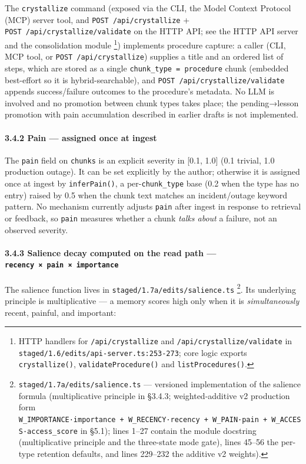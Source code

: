 \documentclass[
]{article}
\begin{document}
The \texttt{crystallize} command (exposed via the CLI, the Model Context
Protocol (MCP) server tool, and \texttt{POST\ /api/crystallize} +
\texttt{POST\ /api/crystallize/validate} on the HTTP API; see the HTTP
API server and the consolidation module \footnote{HTTP handlers for
  \texttt{/api/crystallize} and \texttt{/api/crystallize/validate} in
  \texttt{staged/1.6/edits/api-server.ts:253-273}; core logic exports
  \texttt{crystallize()}, \texttt{validateProcedure()} and
  \texttt{listProcedures()}.}) implements procedure capture: a caller
(CLI, MCP tool, or \texttt{POST\ /api/crystallize}) supplies a title and
an ordered list of steps, which are stored as a single
\texttt{chunk\_type\ =\ procedure} chunk (embedded best-effort so it is
hybrid-searchable), and \texttt{POST\ /api/crystallize/validate} appends
success/failure outcomes to the procedure's metadata. No LLM is involved
and no promotion between chunk types takes place; the pending→lesson
promotion with pain accumulation described in earlier drafts is not
implemented.

\paragraph{3.4.2 Pain --- assigned once at
ingest}\label{pain-assigned-once-at-ingest}

The \texttt{pain} field on \texttt{chunks} is an explicit severity in
{[}0.1, 1.0{]} (0.1 trivial, 1.0 production outage). It can be set
explicitly by the author; otherwise it is assigned once at ingest by
\texttt{inferPain()}, a per-\texttt{chunk\_type} base (0.2 when the type
has no entry) raised by 0.5 when the chunk text matches an
incident/outage keyword pattern. No mechanism currently adjusts
\texttt{pain} after ingest in response to retrieval or feedback, so
\texttt{pain} measures whether a chunk \emph{talks about} a failure, not
an observed severity.

\paragraph{\texorpdfstring{3.4.3 Salience decay computed on the read
path ---
\texttt{recency\ ×\ pain\ ×\ importance}}{3.4.3 Salience decay computed on the read path --- recency × pain × importance}}\label{salience-decay-computed-on-the-read-path-recency-pain-importance}

The salience function lives in \texttt{staged/1.7a/edits/salience.ts}
\footnote{\texttt{staged/1.7a/edits/salience.ts} --- versioned
  implementation of the salience formula (multiplicative principle in
  §3.4.3; weighted-additive v2 production form
  \texttt{W\_IMPORTANCE·importance\ +\ W\_RECENCY·recency\ +\ W\_PAIN·pain\ +\ W\_ACCESS·access\_score}
  in §5.1); lines 1--27 contain the module docstring (multiplicative
  principle and the three-state mode gate), lines 45--56 the per-type
  retention defaults, and lines 229--232 the additive v2 weights).}. Its
underlying principle is multiplicative --- a memory scores high only
when it is \emph{simultaneously} recent, painful, and important:
\end{document}
